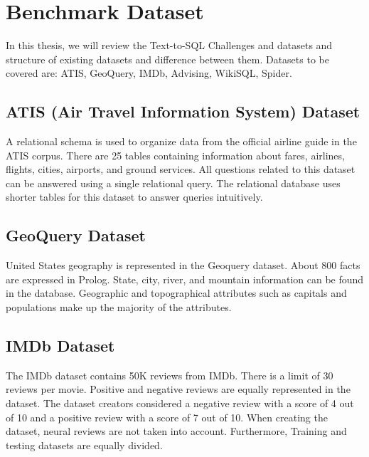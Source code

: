 \section{Benchmark Dataset}

In this thesis, we will review the Text-to-SQL Challenges and datasets and structure of existing datasets and difference between them. Datasets to be covered are: ATIS, GeoQuery, IMDb, Advising, WikiSQL, Spider.

\subsection{ATIS (Air Travel Information System) Dataset}

A relational schema is used to organize data from the official airline guide in the ATIS corpus. There are 25 tables containing information about fares, airlines, flights, cities, airports, and ground services. All questions related to this dataset can be answered using a single relational query. The relational database uses shorter tables for this dataset to answer queries intuitively.


\subsection{GeoQuery Dataset}

United States geography is represented in the Geoquery dataset. About 800 facts are expressed in Prolog. State, city, river, and mountain information can be found in the database. Geographic and topographical attributes such as capitals and populations make up the majority of the attributes.

\subsection{IMDb Dataset}

The IMDb dataset contains 50K reviews from IMDb. There is a limit of 30 reviews per movie\cite{maas-EtAl:2011:ACL-HLT2011}. Positive and negative reviews are equally represented in the dataset. The dataset creators considered a negative review with a score of 4 out of 10 and a positive review with a score of 7 out of 10. When creating the dataset, neural reviews are not taken into account. Furthermore, Training and testing datasets are equally divided.

